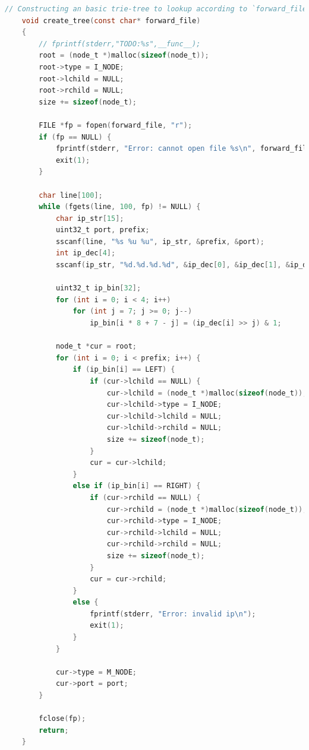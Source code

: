 \documentclass[UTF8]{report}
\begin{document}
\begin{lstlisting}[language=C]
    // Constructing an basic trie-tree to lookup according to `forward_file`
    void create_tree(const char* forward_file)
    {
        // fprintf(stderr,"TODO:%s",__func__);
        root = (node_t *)malloc(sizeof(node_t));
        root->type = I_NODE;
        root->lchild = NULL;
        root->rchild = NULL;
        size += sizeof(node_t);
    
        FILE *fp = fopen(forward_file, "r");
        if (fp == NULL) {
            fprintf(stderr, "Error: cannot open file %s\n", forward_file);
            exit(1);
        }
    
        char line[100];
        while (fgets(line, 100, fp) != NULL) {
            char ip_str[15];
            uint32_t port, prefix;
            sscanf(line, "%s %u %u", ip_str, &prefix, &port);
            int ip_dec[4];
            sscanf(ip_str, "%d.%d.%d.%d", &ip_dec[0], &ip_dec[1], &ip_dec[2], &ip_dec[3]);
            
            uint32_t ip_bin[32];
            for (int i = 0; i < 4; i++) 
                for (int j = 7; j >= 0; j--) 
                    ip_bin[i * 8 + 7 - j] = (ip_dec[i] >> j) & 1;
    
            node_t *cur = root;
            for (int i = 0; i < prefix; i++) {
                if (ip_bin[i] == LEFT) {
                    if (cur->lchild == NULL) {
                        cur->lchild = (node_t *)malloc(sizeof(node_t));
                        cur->lchild->type = I_NODE;
                        cur->lchild->lchild = NULL;
                        cur->lchild->rchild = NULL;
                        size += sizeof(node_t);
                    }
                    cur = cur->lchild;
                }
                else if (ip_bin[i] == RIGHT) {
                    if (cur->rchild == NULL) {
                        cur->rchild = (node_t *)malloc(sizeof(node_t));
                        cur->rchild->type = I_NODE;
                        cur->rchild->lchild = NULL;
                        cur->rchild->rchild = NULL;
                        size += sizeof(node_t);
                    }
                    cur = cur->rchild;
                }
                else {
                    fprintf(stderr, "Error: invalid ip\n");
                    exit(1);
                }
            }
    
            cur->type = M_NODE;
            cur->port = port;
        }
    
        fclose(fp);
        return;
    }
\end{lstlisting}
\end{document}
